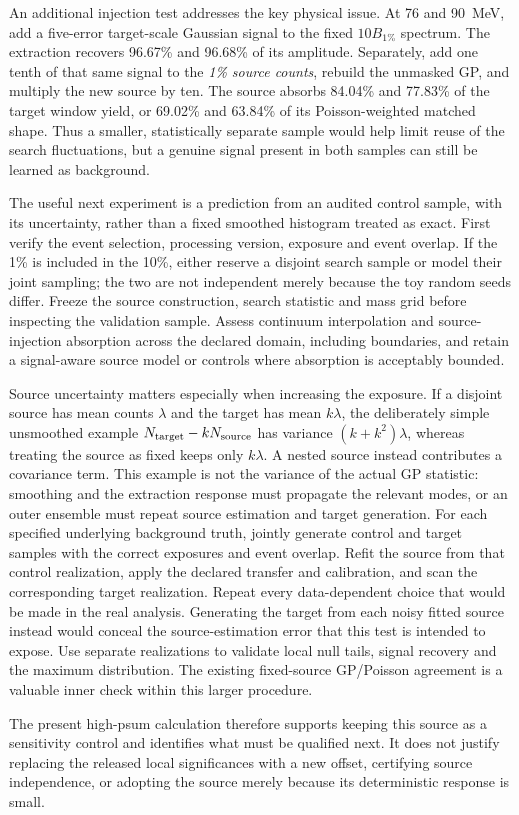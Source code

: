 An additional injection test addresses the key physical issue. At 76 and 90~MeV, add a five-error target-scale Gaussian signal to the fixed $10B_{1\%}$ spectrum. The extraction recovers 96.67\% and 96.68\% of its amplitude. Separately, add one tenth of that same signal to the \emph{1\% source counts}, rebuild the unmasked GP, and multiply the new source by ten. The source absorbs 84.04\% and 77.83\% of the target window yield, or 69.02\% and 63.84\% of its Poisson-weighted matched shape. Thus a smaller, statistically separate sample would help limit reuse of the search fluctuations, but a genuine signal present in both samples can still be learned as background.

The useful next experiment is a prediction from an audited control sample, with its uncertainty, rather than a fixed smoothed histogram treated as exact. First verify the event selection, processing version, exposure and event overlap. If the 1\% is included in the 10\%, either reserve a disjoint search sample or model their joint sampling; the two are not independent merely because the toy random seeds differ. Freeze the source construction, search statistic and mass grid before inspecting the validation sample. Assess continuum interpolation and source-injection absorption across the declared domain, including boundaries, and retain a signal-aware source model or controls where absorption is acceptably bounded.

Source uncertainty matters especially when increasing the exposure. If a disjoint source has mean counts $\lambda$ and the target has mean $k\lambda$, the deliberately simple unsmoothed example $N_{\rm target}-kN_{\rm source}$ has variance $(k+k^2)\lambda$, whereas treating the source as fixed keeps only $k\lambda$. A nested source instead contributes a covariance term. This example is not the variance of the actual GP statistic: smoothing and the extraction response must propagate the relevant modes, or an outer ensemble must repeat source estimation and target generation. For each specified underlying background truth, jointly generate control and target samples with the correct exposures and event overlap. Refit the source from that control realization, apply the declared transfer and calibration, and scan the corresponding target realization. Repeat every data-dependent choice that would be made in the real analysis. Generating the target from each noisy fitted source instead would conceal the source-estimation error that this test is intended to expose. Use separate realizations to validate local null tails, signal recovery and the maximum distribution. The existing fixed-source GP/Poisson agreement is a valuable inner check within this larger procedure.

The present high-psum calculation therefore supports keeping this source as a sensitivity control and identifies what must be qualified next. It does not justify replacing the released local significances with a new offset, certifying source independence, or adopting the source merely because its deterministic response is small.
